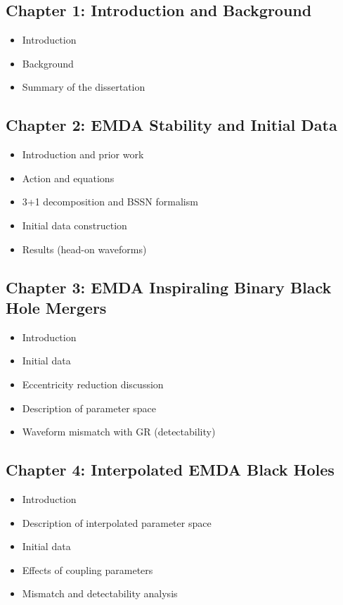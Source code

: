 \documentclass[12pt]{article}
\begin{document}
\subsection{Chapter 1: Introduction and Background}
\begin{itemize}
    \item Introduction
    \item Background
    \item Summary of the dissertation
\end{itemize}

\subsection{Chapter 2: EMDA Stability and Initial Data}
\begin{itemize}
    \item Introduction and prior work
    \item Action and equations
    \item 3+1 decomposition and BSSN formalism
    \item Initial data construction
    \item Results (head-on waveforms)
\end{itemize}

\subsection{Chapter 3: EMDA Inspiraling Binary Black Hole Mergers}
\begin{itemize}
    \item Introduction
    \item Initial data
    \item Eccentricity reduction discussion
    \item Description of parameter space
    \item Waveform mismatch with GR (detectability)
\end{itemize}

\subsection{Chapter 4: Interpolated EMDA Black Holes}
\begin{itemize}
    \item Introduction
    \item Description of interpolated parameter space
    \item Initial data
    \item Effects of coupling parameters
    \item Mismatch and detectability analysis
\end{itemize}
\end{document}
